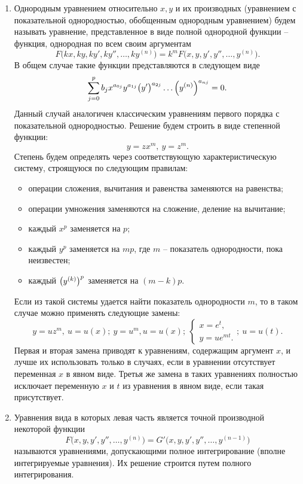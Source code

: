 \begin{enumerate}
        \item Однородным уравнением относительно $ x, y $ и их производных (уравнением с показательной однородностью, обобщенным однородным уравнением) будем называть уравнение, представленное в виде полной однородной функции -- функция, однородная по всем своим аргументам
            \[
                F \Big( kx, ky, ky', ky'', \dots, ky^{(n)} \Big) = k^m F \Big( x, y, y', y'', \dots, y^{(n)} \Big).
            \]
            В общем случае такие функции представляются в следующем виде
            \[
                \sum^p_{j = 0} b_j x^{a_{0j}} y^{a_{1j}} \bigl( y' \bigr)^{a_{2j}} \dots \Big( y^{(n)} \Big)^{a_{nj}} = 0.
            \]
            Данный случай аналогичен классическим уравнениям первого порядка с показательной однородностью. Решение будем строить в виде степенной функции:
            \[
                y = zx^m, ~ y = z^m.
            \]
            Степень будем определять через соответствующую характеристическую систему, строящуюся по следующим правилам:
            \begin{itemize}
                \item операции сложения, вычитания и равенства заменяются на равенства;
                \item операции умножения заменяются на сложение, деление на вычитание;
                \item каждый $ x^p $ заменяется на $ p $;
                \item каждый $ y^p $ заменяется на $ mp $, где $ m $ -- показатель однородности, пока неизвестен;
                \item каждый $ \bigl( y^{(k)} \bigr)^p $ заменяется на $ (m - k)p $.
            \end{itemize}
            Если из такой системы удается найти показатель однородности $ m $, то в таком случае можно применять следующие замены:
            \[
                y = uz^m, ~ u = u(x); ~ y = u^m, u = u(x); ~
                \begin{cases}
                    x = e^t, \\
                    y = ue^{mt}.
                \end{cases};
                ~ u = u(t).
            \]
            Первая и вторая замена приводят к уравнениям, содержащим аргумент $ x $, и лучше их использовать только в случаях, если в уравнении отсутствует переменная $ x $ в явном виде. Третья же замена в таких уравнениях полностью исключает переменную $ x $ и $ t $ из уравнения в явном виде, если такая присутствует.

        \item Уравнения вида в которых левая часть является точной производной некоторой функции
            \[
                F \Big( x, y, y', y'', \dots, y^{(n)} \Big) = G' \Big( x, y, y', y'', \dots, y^{(n - 1)} \Big) 
            \]
            называются уравнениями, допускающими полное интегрирование (вполне интегрируемые уравнения). Их решение строится путем полного интегрирования.

    \end{enumerate}

